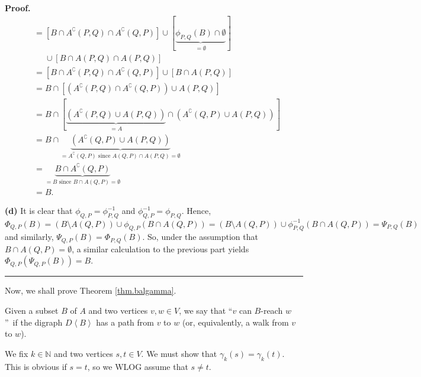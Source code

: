 \documentclass[numbers=enddot,12pt,final,onecolumn,notitlepage]{scrartcl}%
\theoremstyle{definition}
\newenvironment{proof}[1][Proof]{\noindent\textbf{#1.} }{\ \rule{0.5em}{0.5em}}
\theoremstyle{plainsl}
\begin{document}
\begin{proof}
\begin{align*}
& = [B \cap A^{\complement}(P,Q) \cap A^{\complement}(Q,P)] \cup
[\underbrace{\phi_{P,Q}(B) \cap\emptyset}_{=\emptyset}]\\
&  \ \ \ \ \ \ \cup[B \cap A(P,Q) \cap A(P,Q)]\\
& = [B \cap A^{\complement}(P,Q) \cap A^{\complement}(Q,P)] \cup[B \cap
A(P,Q)]\\
& = B \cap[(A^{\complement}(P,Q) \cap A^{\complement}(Q,P)) \cup A(P,Q)]\\
& = B \cap[\underbrace{(A^{\complement}(P,Q) \cup A(P,Q))}_{=A} \cap
(A^{\complement}(Q,P) \cup A(P,Q))]\\
& = B \cap\underbrace{(A^{\complement}(Q,P) \cup A(P,Q))}_{=A^{\complement
}(Q,P) \text{ since } A(Q,P) \cap A(P,Q) = \emptyset}\\
& = \underbrace{B \cap A^{\complement}(Q,P)}_{=B \text{ since } B \cap A(Q,P)
= \emptyset}\\
& = B.
\end{align*}


\medskip\textbf{(d)} It is clear that $\phi_{Q,P} = \phi_{P,Q}^{-1}$ and
$\phi_{Q,P}^{-1} = \phi_{P,Q}$. Hence, $\Phi_{Q,P}(B) = (B \setminus A(Q,P))
\cup\phi_{Q,P}(B \cap A(Q,P)) = (B \setminus A(Q,P)) \cup\phi_{P,Q}^{-1}(B
\cap A(Q,P)) = \Psi_{P,Q}(B)$ and similarly, $\Psi_{Q,P}(B) = \Phi_{P,Q}(B)$.
So, under the assumption that $B \cap A(Q,P) = \emptyset$, a similar
calculation to the previous part yields $\Phi_{Q,P}(\Psi_{Q,P}(B)) = B$.
\end{proof}

Now, we shall prove Theorem \ref{thm.balgamma}.

Given a subset $B$ of $A$ and two vertices $v,w\in V$, we say that
\textquotedblleft$v$ can $B$-reach $w$\textquotedblright\ if the digraph
$D\left\langle B\right\rangle $ has a path from $v$ to $w$ (or, equivalently,
a walk from $v$ to $w$).

We fix $k\in\mathbb{N}$ and two vertices $s,t\in V$. We must show that
$\gamma_{k}\left(  s\right)  =\gamma_{k}\left(  t\right)  $. This is obvious
if $s=t$, so we WLOG assume that $s\neq t$.
\end{document}
